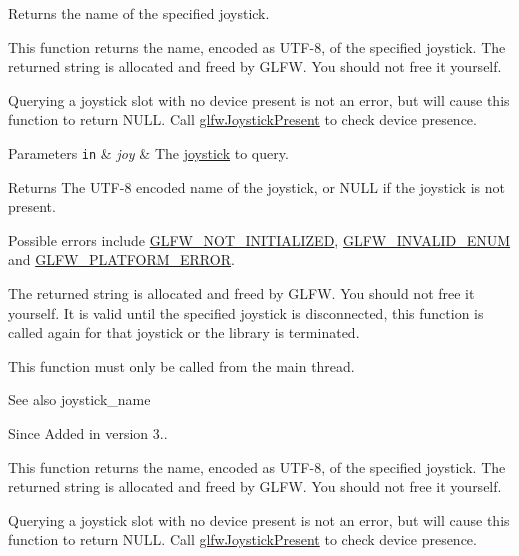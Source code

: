 Returns the name of the specified joystick. 

This function returns the name, encoded as U\+T\+F-\/8, of the specified joystick. The returned string is allocated and freed by G\+L\+FW. You should not free it yourself.

Querying a joystick slot with no device present is not an error, but will cause this function to return {\ttfamily N\+U\+LL}. Call \hyperlink{group__input_ga7f81f22f355f4b7d315caf73cdfd9906}{glfw\+Joystick\+Present} to check device presence.


\begin{DoxyParams}[1]{Parameters}
\mbox{\tt in}  & {\em joy} & The \hyperlink{group__joysticks}{joystick} to query. \\
\hline
\end{DoxyParams}
\begin{DoxyReturn}{Returns}
The U\+T\+F-\/8 encoded name of the joystick, or {\ttfamily N\+U\+LL} if the joystick is not present.
\end{DoxyReturn}
Possible errors include \hyperlink{group__errors_ga2374ee02c177f12e1fa76ff3ed15e14a}{G\+L\+F\+W\+\_\+\+N\+O\+T\+\_\+\+I\+N\+I\+T\+I\+A\+L\+I\+Z\+ED}, \hyperlink{group__errors_ga76f6bb9c4eea73db675f096b404593ce}{G\+L\+F\+W\+\_\+\+I\+N\+V\+A\+L\+I\+D\+\_\+\+E\+N\+UM} and \hyperlink{group__errors_gad44162d78100ea5e87cdd38426b8c7a1}{G\+L\+F\+W\+\_\+\+P\+L\+A\+T\+F\+O\+R\+M\+\_\+\+E\+R\+R\+OR}.

The returned string is allocated and freed by G\+L\+FW. You should not free it yourself. It is valid until the specified joystick is disconnected, this function is called again for that joystick or the library is terminated.

This function must only be called from the main thread.

\begin{DoxySeeAlso}{See also}
joystick\+\_\+name
\end{DoxySeeAlso}
\begin{DoxySince}{Since}
Added in version 3..
\end{DoxySince}
This function returns the name, encoded as U\+T\+F-\/8, of the specified joystick. The returned string is allocated and freed by G\+L\+FW. You should not free it yourself.

Querying a joystick slot with no device present is not an error, but will cause this function to return {\ttfamily N\+U\+LL}. Call \hyperlink{group__input_ga7f81f22f355f4b7d315caf73cdfd9906}{glfw\+Joystick\+Present} to check device presence.


